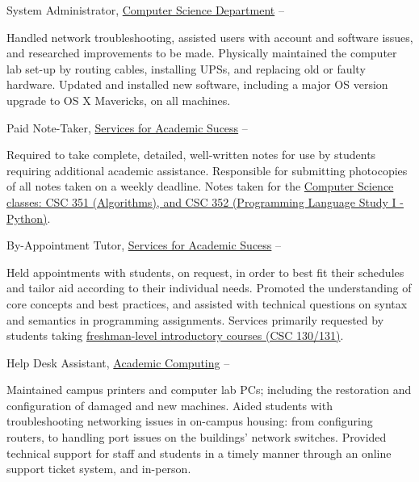 \documentclass[letterpaper,MMMyyyy,nonstopmode]{simpleresumecv}
\begin{document}
\begin{Body}
\Gap

\Entry
System Administrator,
\href{http://cs.rocky.edu}
{Computer Science Department}
\hfill
{} --
\begin{Detail}
\BulletItem
Handled network troubleshooting, assisted users with account and software issues, and researched improvements to be made.
\BulletItem
Physically maintained the computer lab set-up by routing cables, installing UPSs, and replacing old or faulty hardware.
\BulletItem
Updated and installed new software, including a major OS version upgrade to OS X Mavericks, on all machines.
\end{Detail}

\Gap

\Entry
Paid Note-Taker,
\href{https://www.rocky.edu/student-life/student-support/academic-support/ServicesAcademicSuccess.php}
{Services for Academic Sucess}
\hfill
{} --
\begin{Detail}
\BulletItem
Required to take complete, detailed, well-written notes for use by students requiring additional academic assistance.
\BulletItem
Responsible for submitting photocopies of all notes taken on a weekly deadline.
\BulletItem
Notes taken for the \href{https://www.rocky.edu/academics/catalog/program/9/Computer_Science#courses-content}{Computer Science classes: CSC 351 (Algorithms), and CSC 352 (Programming Language Study I - Python)}.
\end{Detail}

\Gap

\Entry
By-Appointment Tutor,
\href{https://www.rocky.edu/student-life/student-support/academic-support/ServicesAcademicSuccess.php}
{Services for Academic Sucess}
\hfill
{} --
\begin{Detail}
\BulletItem
Held appointments with students, on request, in order to best fit their schedules and tailor aid according to their individual needs.
\BulletItem
Promoted the understanding of core concepts and best practices, and assisted with technical questions on syntax and semantics in programming assignments.
\BulletItem
Services primarily requested by students taking \href{https://www.rocky.edu/academics/catalog/program/9/Computer_Science#courses-content}{freshman-level introductory courses (CSC 130/131)}.
\end{Detail}

\Gap

\Entry
Help Desk Assistant,
\href{https://rocky.edu/student-life/student-support/academic-computing/}
{Academic Computing}
\hfill
{} --
\begin{Detail}
\BulletItem
Maintained campus printers and computer lab PCs; including the restoration and configuration of damaged and new machines.
\BulletItem
Aided students with troubleshooting networking issues in on-campus housing: from configuring routers, to handling port issues on the buildings' network switches.
\BulletItem
Provided technical support for staff and students in a timely manner through an online support ticket system, and in-person.
\end{Detail}


\end{Body}
\end{document}
